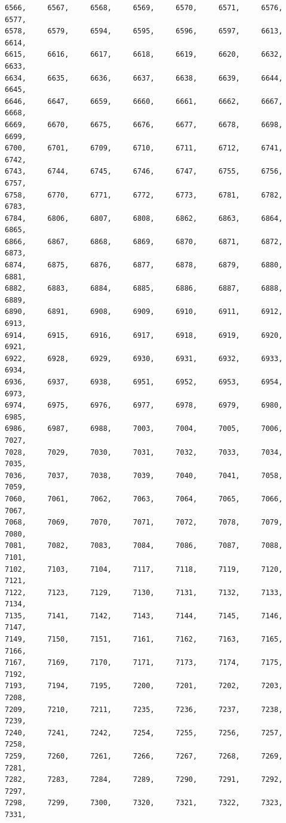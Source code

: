 \documentclass[a4paper,11pt]{report}
\begin{document}
\begin{verbatim}
6566,     6567,     6568,     6569,     6570,     6571,     6576,     6577,
6578,     6579,     6594,     6595,     6596,     6597,     6613,     6614,
6615,     6616,     6617,     6618,     6619,     6620,     6632,     6633,
6634,     6635,     6636,     6637,     6638,     6639,     6644,     6645,
6646,     6647,     6659,     6660,     6661,     6662,     6667,     6668,
6669,     6670,     6675,     6676,     6677,     6678,     6698,     6699,
6700,     6701,     6709,     6710,     6711,     6712,     6741,     6742,
6743,     6744,     6745,     6746,     6747,     6755,     6756,     6757,
6758,     6770,     6771,     6772,     6773,     6781,     6782,     6783,
6784,     6806,     6807,     6808,     6862,     6863,     6864,     6865,
6866,     6867,     6868,     6869,     6870,     6871,     6872,     6873,
6874,     6875,     6876,     6877,     6878,     6879,     6880,     6881,
6882,     6883,     6884,     6885,     6886,     6887,     6888,     6889,
6890,     6891,     6908,     6909,     6910,     6911,     6912,     6913,
6914,     6915,     6916,     6917,     6918,     6919,     6920,     6921,
6922,     6928,     6929,     6930,     6931,     6932,     6933,     6934,
6936,     6937,     6938,     6951,     6952,     6953,     6954,     6973,
6974,     6975,     6976,     6977,     6978,     6979,     6980,     6985,
6986,     6987,     6988,     7003,     7004,     7005,     7006,     7027,
7028,     7029,     7030,     7031,     7032,     7033,     7034,     7035,
7036,     7037,     7038,     7039,     7040,     7041,     7058,     7059,
7060,     7061,     7062,     7063,     7064,     7065,     7066,     7067,
7068,     7069,     7070,     7071,     7072,     7078,     7079,     7080,
7081,     7082,     7083,     7084,     7086,     7087,     7088,     7101,
7102,     7103,     7104,     7117,     7118,     7119,     7120,     7121,
7122,     7123,     7129,     7130,     7131,     7132,     7133,     7134,
7135,     7141,     7142,     7143,     7144,     7145,     7146,     7147,
7149,     7150,     7151,     7161,     7162,     7163,     7165,     7166,
7167,     7169,     7170,     7171,     7173,     7174,     7175,     7192,
7193,     7194,     7195,     7200,     7201,     7202,     7203,     7208,
7209,     7210,     7211,     7235,     7236,     7237,     7238,     7239,
7240,     7241,     7242,     7254,     7255,     7256,     7257,     7258,
7259,     7260,     7261,     7266,     7267,     7268,     7269,     7281,
7282,     7283,     7284,     7289,     7290,     7291,     7292,     7297,
7298,     7299,     7300,     7320,     7321,     7322,     7323,     7331,

\end{verbatim}
\end{document}
